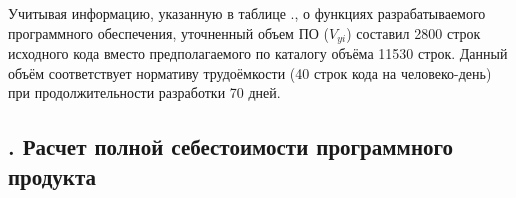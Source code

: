{    \par \redline Учитывая информацию, указанную в таблице \thechaptercntr .\thetablecntr, о функциях разрабатываемого программного обеспечения, уточненный объем ПО ($V_{yi}$) составил 2800 строк исходного кода вместо предполагаемого по каталогу объёма 11530 строк. Данный объём соответствует нормативу трудоёмкости (40 строк кода на человеко-день) при продолжительности разработки 70 дней. 

    \par
}

\subtitlespace

\subsection*{ 
    \gostTitleFont
    \redline
    \thechaptercntr .\thesubchaptercntr \spc
    Расчет полной себестоимости программного продукта
} \addtocounter{subchaptercntr}{1}

\subtitlespace

